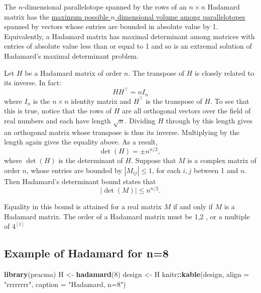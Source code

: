 \documentclass[
  12pt,
  a4paper,
]{article}
\newenvironment{Shaded}{\begin{snugshade}}{\end{snugshade}}
\newcommand{\AttributeTok}[1]{\textcolor[rgb]{0.13,0.29,0.53}{#1}}
\newcommand{\DecValTok}[1]{\textcolor[rgb]{0.00,0.00,0.81}{#1}}
\newcommand{\FunctionTok}[1]{\textcolor[rgb]{0.13,0.29,0.53}{\textbf{#1}}}
\newcommand{\NormalTok}[1]{#1}
\newcommand{\OtherTok}[1]{\textcolor[rgb]{0.56,0.35,0.01}{#1}}
\newcommand{\SpecialCharTok}[1]{\textcolor[rgb]{0.81,0.36,0.00}{\textbf{#1}}}
\newcommand{\StringTok}[1]{\textcolor[rgb]{0.31,0.60,0.02}{#1}}
\numberwithin{equation}{section}
\theoremstyle{plain}
\theoremstyle{definition}
\theoremstyle{remark}
\theoremstyle{note}
\begin{document}
The \(n\)-dimensional parallelotope spanned by the rows of an
\(n \times n\) Hadamard matrix has the
\underline{maximum possible $n$ dimensional volume among parallelotopes}
spanned by vectors whose entries are bounded in absolute value by 1.
Equivalently, a Hadamard matrix has maximal determinant among matrices
with entries of absolute value less than or equal to 1 and so is an
extremal solution of Hadamard's maximal determinant problem.

Let \(H\) be a Hadamard matrix of order \(n\). The transpose of \(H\) is
closely related to its inverse. In fact: \[
H H^{\top}=n I_n
\] where \(I_n\) is the \(n \times n\) identity matrix and \(H^{\top}\)
is the transpose of \(H\). To see that this is true, notice that the
rows of \(H\) are all orthogonal vectors over the field of real numbers
and each have length \(\sqrt{n}\). Dividing \(H\) through by this length
gives an orthogonal matrix whose transpose is thus its inverse.
Multiplying by the length again gives the equality above. As a result,
\[
\operatorname{det}(H)= \pm n^{n / 2} \text {, }
\] where \(\operatorname{det}(H)\) is the determinant of \(H\). Suppose
that \(M\) is a complex matrix of order \(n\), whose entries are bounded
by \(\left|M_{i j}\right| \leq 1\), for each \(i, j\) between 1 and
\(n\). Then Hadamard's determinant bound states that \[
|\operatorname{det}(M)| \leq n^{n / 2} .
\]

Equality in this bound is attained for a real matrix \(M\) if and only
if \(M\) is a Hadamard matrix. The order of a Hadamard matrix must be
1,2 , or a multiple of \(4^{[1]}\)

\newpage

\hypertarget{example-of-hadamard-for-n8}{%
\subsection{Example of Hadamard for
n=8}\label{example-of-hadamard-for-n8}}

\begin{Shaded}
\begin{Highlighting}[]
\FunctionTok{library}\NormalTok{(pracma)}
\NormalTok{H }\OtherTok{\textless{}{-}} \FunctionTok{hadamard}\NormalTok{(}\DecValTok{8}\NormalTok{)}
\NormalTok{design }\OtherTok{\textless{}{-}}\NormalTok{ H}
\NormalTok{knitr}\SpecialCharTok{::}\FunctionTok{kable}\NormalTok{(design, }\AttributeTok{align =} \StringTok{"rrrrrrrr"}\NormalTok{, }\AttributeTok{caption =} \StringTok{"Hadamard, n=8"}\NormalTok{)}
\end{Highlighting}
\end{Shaded}
\end{document}
